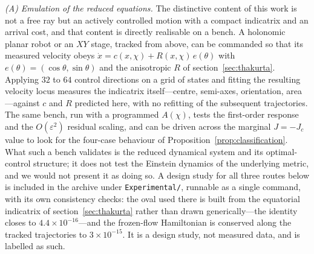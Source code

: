 \documentclass[12pt]{iopart}
\theoremstyle{plain}
\theoremstyle{definition}
\theoremstyle{remark}
\begin{document}
\emph{(A) Emulation of the reduced equations.} The distinctive content of this work
is not a free ray but an actively controlled motion with a compact indicatrix and an
arrival cost, and that content is directly realisable on a bench. A holonomic planar
robot or an $XY$ stage, tracked from above, can be commanded so that its measured
velocity obeys $\dot x=c(x,\chi)+R(x,\chi)\,e(\theta)$ with $e(\theta)=(\cos\theta,
\sin\theta)$ and the anisotropic $R$ of section~\ref{sec:thakurta}. Applying $32$ to
$64$ control directions on a grid of states and fitting the resulting velocity locus
measures the indicatrix itself---centre, semi-axes, orientation, area---against $c$
and $R$ predicted here, with no refitting of the subsequent trajectories. The same
bench, run with a programmed $A(\chi)$, tests the first-order response and the
$O(\varepsilon^2)$ residual scaling, and can be driven across the marginal $J=-J_c$
value to look for the four-case behaviour of Proposition~\ref{prop:classification}.
What such a bench validates is the reduced dynamical system and its optimal-control
structure; it does not test the Einstein dynamics of the underlying metric, and we
would not present it as doing so. A design study for all three routes below is
included in the archive under \texttt{Experimental/}, runnable as a single command,
with its own consistency checks: the oval used there is built from the equatorial
indicatrix of section~\ref{sec:thakurta} rather than drawn generically---the
identity closes to $4.4\times10^{-16}$---and the frozen-flow Hamiltonian is
conserved along the tracked trajectories to $3\times10^{-15}$. It is a design study,
not measured data, and is labelled as such.
\end{document}

